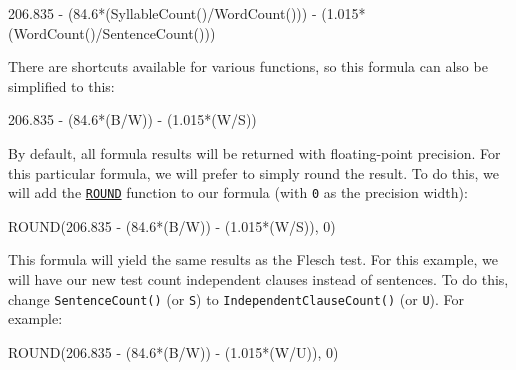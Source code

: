 \documentclass[
]{book}
\newenvironment{Shaded}{\begin{snugshade}}{\end{snugshade}}
\newcommand{\DecValTok}[1]{\textcolor[rgb]{0.00,0.00,0.81}{#1}}
\newcommand{\FloatTok}[1]{\textcolor[rgb]{0.00,0.00,0.81}{#1}}
\newcommand{\FunctionTok}[1]{\textcolor[rgb]{0.00,0.00,0.00}{#1}}
\newcommand{\NormalTok}[1]{#1}
\newcommand{\SpecialCharTok}[1]{\textcolor[rgb]{0.00,0.00,0.00}{#1}}
\theoremstyle{definition}
\theoremstyle{definition}
\theoremstyle{definition}
\theoremstyle{definition}
\theoremstyle{remark}
\begin{document}
\begin{Shaded}
\begin{Highlighting}[]
\FloatTok{206.835} \SpecialCharTok{{-}}\NormalTok{ (}\FloatTok{84.6}\SpecialCharTok{*}\NormalTok{(}\FunctionTok{SyllableCount}\NormalTok{()}\SpecialCharTok{/}\FunctionTok{WordCount}\NormalTok{())) }\SpecialCharTok{{-}}  
\NormalTok{    (}\FloatTok{1.015}\SpecialCharTok{*}\NormalTok{(}\FunctionTok{WordCount}\NormalTok{()}\SpecialCharTok{/}\FunctionTok{SentenceCount}\NormalTok{()))}
\end{Highlighting}
\end{Shaded}

There are shortcuts available for various functions, so this formula can also be simplified to this:

\begin{Shaded}
\begin{Highlighting}[]
\FloatTok{206.835} \SpecialCharTok{{-}}\NormalTok{ (}\FloatTok{84.6}\SpecialCharTok{*}\NormalTok{(B}\SpecialCharTok{/}\NormalTok{W)) }\SpecialCharTok{{-}}\NormalTok{ (}\FloatTok{1.015}\SpecialCharTok{*}\NormalTok{(W}\SpecialCharTok{/}\NormalTok{S))}
\end{Highlighting}
\end{Shaded}

By default, all formula results will be returned with floating-point precision. For this particular formula, we will prefer to simply round the result. To do this, we will add the \protect\hyperlink{custom-test-functions}{\texttt{ROUND}} function to our formula (with \texttt{0} as the precision width):

\begin{Shaded}
\begin{Highlighting}[]
\FunctionTok{ROUND}\NormalTok{(}\FloatTok{206.835} \SpecialCharTok{{-}}\NormalTok{ (}\FloatTok{84.6}\SpecialCharTok{*}\NormalTok{(B}\SpecialCharTok{/}\NormalTok{W)) }\SpecialCharTok{{-}}\NormalTok{ (}\FloatTok{1.015}\SpecialCharTok{*}\NormalTok{(W}\SpecialCharTok{/}\NormalTok{S)), }\DecValTok{0}\NormalTok{)}
\end{Highlighting}
\end{Shaded}

This formula will yield the same results as the Flesch test. For this example, we will have our new test count independent clauses instead of sentences. To do this, change \texttt{SentenceCount()} (or \texttt{S}) to \texttt{IndependentClauseCount()} (or \texttt{U}). For example:

\begin{Shaded}
\begin{Highlighting}[]
\FunctionTok{ROUND}\NormalTok{(}\FloatTok{206.835} \SpecialCharTok{{-}}\NormalTok{ (}\FloatTok{84.6}\SpecialCharTok{*}\NormalTok{(B}\SpecialCharTok{/}\NormalTok{W)) }\SpecialCharTok{{-}}\NormalTok{ (}\FloatTok{1.015}\SpecialCharTok{*}\NormalTok{(W}\SpecialCharTok{/}\NormalTok{U)), }\DecValTok{0}\NormalTok{)}
\end{Highlighting}
\end{Shaded}
\end{document}
